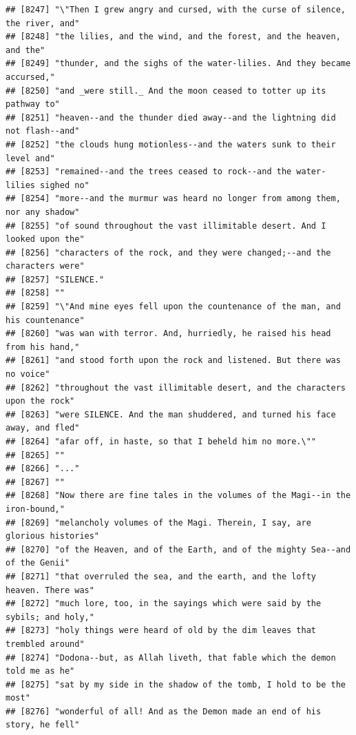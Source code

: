 \documentclass{article}\usepackage[]{graphicx}\usepackage[]{color}
\makeatletter
\newenvironment{kframe}{%
 \def\at@end@of@kframe{}%
 \ifinner\ifhmode%
  \def\at@end@of@kframe{\end{minipage}}%
  \begin{minipage}{\columnwidth}%
 \fi\fi%
 \def\FrameCommand##1{\hskip\@totalleftmargin \hskip-\fboxsep
 \colorbox{shadecolor}{##1}\hskip-\fboxsep
     \hskip-\linewidth \hskip-\@totalleftmargin \hskip\columnwidth}%
 \MakeFramed {\advance\hsize-\width
   \@totalleftmargin\z@ \linewidth\hsize
   \@setminipage}}%
 {\par\unskip\endMakeFramed%
 \at@end@of@kframe}
\newenvironment{knitrout}{}{} %
\makeatother
\begin{document}
\begin{knitrout}
\begin{kframe}
\begin{verbatim}
## [8247] "\"Then I grew angry and cursed, with the curse of silence, the river, and"   
## [8248] "the lilies, and the wind, and the forest, and the heaven, and the"           
## [8249] "thunder, and the sighs of the water-lilies. And they became accursed,"       
## [8250] "and _were still._ And the moon ceased to totter up its pathway to"           
## [8251] "heaven--and the thunder died away--and the lightning did not flash--and"     
## [8252] "the clouds hung motionless--and the waters sunk to their level and"          
## [8253] "remained--and the trees ceased to rock--and the water-lilies sighed no"      
## [8254] "more--and the murmur was heard no longer from among them, nor any shadow"    
## [8255] "of sound throughout the vast illimitable desert. And I looked upon the"      
## [8256] "characters of the rock, and they were changed;--and the characters were"     
## [8257] "SILENCE."                                                                    
## [8258] ""                                                                            
## [8259] "\"And mine eyes fell upon the countenance of the man, and his countenance"   
## [8260] "was wan with terror. And, hurriedly, he raised his head from his hand,"      
## [8261] "and stood forth upon the rock and listened. But there was no voice"          
## [8262] "throughout the vast illimitable desert, and the characters upon the rock"    
## [8263] "were SILENCE. And the man shuddered, and turned his face away, and fled"     
## [8264] "afar off, in haste, so that I beheld him no more.\""                         
## [8265] ""                                                                            
## [8266] "..."                                                                         
## [8267] ""                                                                            
## [8268] "Now there are fine tales in the volumes of the Magi--in the iron-bound,"     
## [8269] "melancholy volumes of the Magi. Therein, I say, are glorious histories"      
## [8270] "of the Heaven, and of the Earth, and of the mighty Sea--and of the Genii"    
## [8271] "that overruled the sea, and the earth, and the lofty heaven. There was"      
## [8272] "much lore, too, in the sayings which were said by the sybils; and holy,"     
## [8273] "holy things were heard of old by the dim leaves that trembled around"        
## [8274] "Dodona--but, as Allah liveth, that fable which the demon told me as he"      
## [8275] "sat by my side in the shadow of the tomb, I hold to be the most"             
## [8276] "wonderful of all! And as the Demon made an end of his story, he fell"        

\end{verbatim}
\end{kframe}
\end{knitrout}
\end{document}
